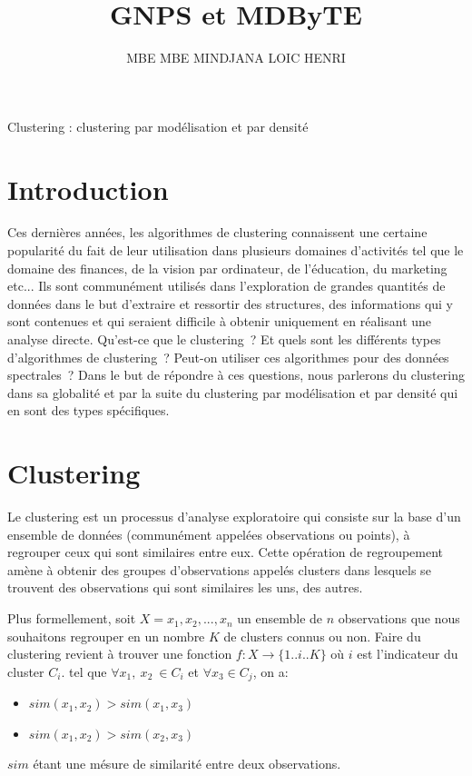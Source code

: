 \documentclass[12pt, french, latin.medieval, a4paper]{report}
\author{MBE MBE MINDJANA LOIC HENRI}
\title{GNPS et MDByTE}
\begin{document}
    
    \pagecouverture
    {Clustering : clustering par modélisation et par densité}
    {}
    \tableofcontents
    \vspace{20cm}
    
    \section{Introduction}
        Ces dernières années, les algorithmes de clustering connaissent une certaine popularité du fait de leur utilisation dans plusieurs domaines d’activités tel que le domaine des finances, de la vision par ordinateur, de l’éducation, du marketing etc... Ils sont communément utilisés dans l’exploration de grandes quantités de données dans le but d’extraire et ressortir des structures, des informations qui y sont contenues et qui seraient difficile à obtenir uniquement en réalisant une analyse directe. Qu’est-ce que le clustering ? Et quels sont les différents types d’algorithmes de clustering ? Peut-on utiliser ces algorithmes pour des données spectrales ? Dans le but de répondre à ces questions, nous parlerons du clustering dans sa globalité et par la suite du clustering par modélisation et par densité qui en sont des types spécifiques.

    \section{Clustering}
    Le clustering est un processus d'analyse exploratoire qui consiste sur la base d’un ensemble de données (communément appelées observations ou points), à regrouper ceux qui sont similaires entre eux. Cette opération de regroupement amène à obtenir des groupes d’observations appelés clusters dans lesquels se trouvent des observations qui sont similaires les uns, des autres.
    
    Plus formellement, soit $X = { x_1, x_2, ..., x_n }$ un ensemble de $n$ observations que nous souhaitons regrouper en un nombre $K$ de clusters connus ou non. Faire du clustering revient à trouver une fonction $f: X \to \{1..i..K\}$ où $i$ est l'indicateur du cluster $C_i$. tel que $\forall x_1,\  x_2\ \in C_i$ et $\forall x_3 \in C_j$, on a:

    \begin{itemize}
        \item $sim(x_1, x_2) > sim(x_1, x_3)$
        \item $sim(x_1, x_2) > sim(x_2, x_3)$
    \end{itemize}
    $sim$ étant une mésure de similarité entre deux observations.    
\end{document}
